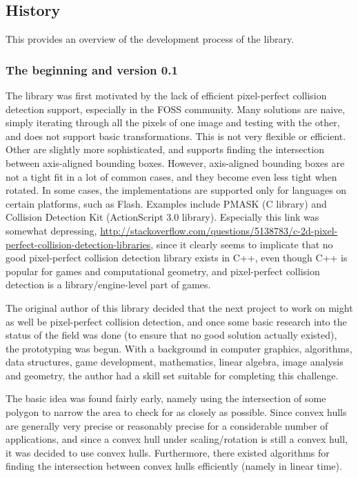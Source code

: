 
\subsection{History}

This provides an overview of the development process of the library.

\subsubsection{The beginning and version 0.1}

The library was first motivated by the lack of efficient pixel-perfect collision detection
support, especially in the FOSS community. Many solutions are naive,
simply iterating through all the pixels of one image and testing with the other,
and does not support basic transformations. This is not very flexible or
efficient. Other are slightly more sophisticated,
and supports finding the intersection between axis-aligned bounding boxes.
However, axis-aligned bounding boxes are not a tight fit in a lot of common
cases, and they become even less tight when rotated. In some cases, the implementations
are supported only for languages on certain platforms, such as Flash. Examples include
PMASK (C library) and Collision Detection Kit (ActionScript 3.0 library).
Especially this link was somewhat depressing,
\url{http://stackoverflow.com/questions/5138783/c-2d-pixel-perfect-collision-detection-libraries},
since it clearly seems to implicate that no good pixel-perfect collision detection library exists in C++,
even though C++ is popular for games and computational geometry,
and pixel-perfect collision detection is a library/engine-level
part of games.

The original author of this library decided that the next project
to work on might as well be pixel-perfect collision detection,
and once some basic research into the status of the field was done
(to ensure that no good solution actually existed),
the prototyping was begun. With a background in computer graphics,
algorithms, data structures, game development, mathematics,
linear algebra, image analysis and geometry,
the author had a skill set suitable for completing this challenge.

The basic idea was found fairly early, namely using the intersection
of some polygon to narrow the area to check for as closely as possible.
Since convex hulls are generally very precise or reasonably precise
for a considerable number of applications, and since a convex hull
under scaling/rotation is still a convex hull, it was decided to use convex hulls.
Furthermore, there existed algorithms for finding the intersection
between convex hulls efficiently (namely in linear time).

